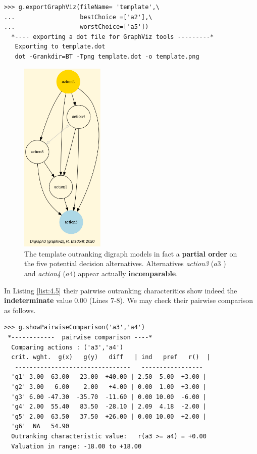 \begin{lstlisting}[basicstyle=\footnotesize]
>>> g.exportGraphViz(fileName= 'template',\
...                  bestChoice =['a2'],\
...                  worstChoice=['a5'])
  *---- exporting a dot file for GraphViz tools ---------*
   Exporting to template.dot
   dot -Grankdir=BT -Tpng template.dot -o template.png
\end{lstlisting}
    
\begin{figure}[h]
\sidecaption
\includegraphics[width=4cm]{Figures/template.png}
\caption{The template outranking digraph models in fact a \textbf{partial order} on the five potential decision alternatives. Alternatives \emph{action3} ($a3$ ) and \emph{action4} ($a4$) appear actually \textbf{incomparable}.}
\label{fig:4.1}       %
\end{figure}

In Listing \ref{list:4.5} their pairwise outranking characteritics show indeed the \textbf{indeterminate} value $0.00$ (Lines 7-8). We may check their pairwise comparison as follows.

\begin{lstlisting}[basicstyle=\footnotesize]
>>> g.showPairwiseComparison('a3','a4')
 *------------  pairwise comparison ----*
  Comparing actions : ('a3','a4')
  crit. wght.  g(x)   g(y)   diff   | ind   pref   r()  | 
   --------------------------------   -----------------
  'g1' 3.00  63.00   23.00  +40.00 | 2.50  5.00  +3.00 | 
  'g2' 3.00   6.00    2.00   +4.00 | 0.00  1.00  +3.00 | 
  'g3' 6.00 -47.30  -35.70  -11.60 | 0.00 10.00  -6.00 | 
  'g4' 2.00  55.40   83.50  -28.10 | 2.09  4.18  -2.00 | 
  'g5' 2.00  63.50   37.50  +26.00 | 0.00 10.00  +2.00 | 
  'g6'  NA   54.90
  Outranking characteristic value:   r(a3 >= a4) = +0.00
  Valuation in range: -18.00 to +18.00
\end{lstlisting}

